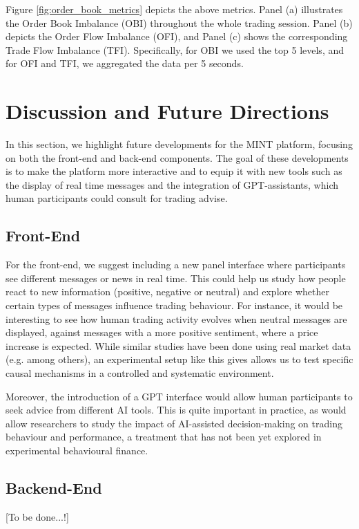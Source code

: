 Figure \ref{fig:order_book_metrics} depicts the above metrics. Panel (a) illustrates the Order Book Imbalance (OBI) throughout the whole trading session. Panel (b) depicts the Order Flow Imbalance (OFI), and Panel (c) shows the corresponding Trade Flow Imbalance (TFI). Specifically, for OBI we used the top 5 levels, and for OFI and TFI, we aggregated the data per 5 seconds.


\section{Discussion and Future Directions}
In this section, we highlight future developments for the MINT platform, focusing on both the front-end and back-end components. The goal of these developments is to make the platform more interactive and to equip it with new tools such as the display of real time messages and the integration of GPT-assistants, which human participants could consult for trading advise. 


\subsection{Front-End}
For the front-end, we suggest including a new panel interface where participants see different messages or news in real time. This could help us study how people react to new information (positive, negative or neutral) and explore whether certain types of messages influence trading behaviour. For instance, it would be interesting to see how human trading activity evolves when neutral messages are displayed, against messages with a more positive sentiment, where a price increase is expected. While similar studies have been done using real market data (e.g. \cite{kurov2019price} among others), an experimental setup like this gives allows us to test specific causal mechanisms in a controlled and systematic environment.

Moreover, the introduction of a GPT interface would allow human participants to seek advice from different AI tools. This is quite important in practice, as would allow researchers to study the impact of AI-assisted decision-making on trading behaviour and performance, a treatment that has not been yet explored in experimental behavioural finance. 

\subsection{Backend-End}
[To be done...!]
